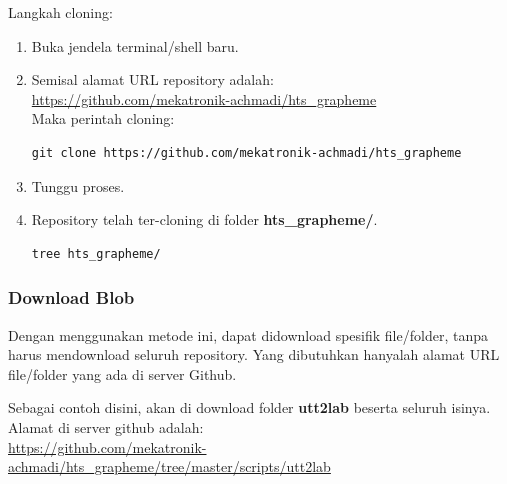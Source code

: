 \documentclass[12pt,]{article}
\begin{document}
	Langkah cloning:
	\begin{enumerate}
		\item Buka jendela terminal/shell baru.
		
		\item Semisal alamat URL repository adalah:\\
		\url{https://github.com/mekatronik-achmadi/hts_grapheme} \\
		Maka perintah cloning:
		\begin{verbatim}
git clone https://github.com/mekatronik-achmadi/hts_grapheme
		\end{verbatim}
		
		\item Tunggu proses.
		
		\item Repository telah ter-cloning di folder \textbf{hts\_grapheme/}.
		\begin{verbatim}
tree hts_grapheme/
		\end{verbatim}
		
	\end{enumerate}
	
	\newpage
	\subsubsection{Download Blob}
	
	Dengan menggunakan metode ini, dapat didownload spesifik file/folder,
	tanpa harus mendownload seluruh repository.
	Yang dibutuhkan hanyalah alamat URL file/folder yang ada di server Github.
	
	Sebagai contoh disini, akan di download folder \textbf{utt2lab} beserta seluruh isinya.
	Alamat di server github adalah:\\
	\url{https://github.com/mekatronik-achmadi/hts_grapheme/tree/master/scripts/utt2lab}
	
\end{document}
